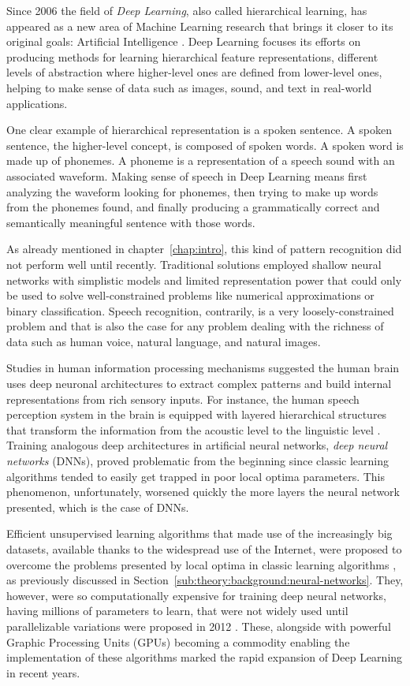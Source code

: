 Since 2006 the field of \emph{Deep Learning}, also called hierarchical learning, has appeared as a new area of Machine Learning research that brings it closer to its original goals: Artificial Intelligence \cite{Deng2014}.
Deep Learning focuses its efforts on producing methods for learning hierarchical feature representations, different levels of abstraction where higher-level ones are defined from lower-level ones, helping to make sense of data such as images, sound, and text in real-world applications.

One clear example of hierarchical representation is a spoken sentence.
A spoken sentence, the higher-level concept, is composed of spoken words.
A spoken word is made up of phonemes.
A phoneme is a representation of a speech sound with an associated waveform.
Making sense of speech in Deep Learning means first analyzing the waveform looking for phonemes, then trying to make up words from the phonemes found, and finally producing a grammatically correct and semantically meaningful sentence with those words.

As already mentioned in chapter~\ref{chap:intro}, this kind of pattern recognition did not perform well until recently.
Traditional solutions employed shallow neural networks with simplistic models and limited representation power that could only be used to solve well-constrained problems like numerical approximations or binary classification.
Speech recognition, contrarily, is a very loosely-constrained problem and that is also the case for any problem dealing with the richness of data such as human voice, natural language, and natural images.

Studies in human information processing mechanisms suggested the human brain uses deep neuronal architectures to extract complex patterns and build internal representations from rich sensory inputs.
For instance, the human speech perception system in the brain is equipped with layered hierarchical structures that transform the information from the acoustic level to the linguistic level \cite{Deng1999,Baker2009}.
Training analogous deep architectures in artificial neural networks, \emph{deep neural networks} (DNNs), proved problematic from the beginning since classic learning algorithms tended to easily get trapped in poor local optima parameters.
This phenomenon, unfortunately, worsened quickly the more layers the neural network presented, which is the case of DNNs.

Efficient unsupervised learning algorithms that made use of the increasingly big datasets, available thanks to the widespread use of the Internet, were proposed to overcome the problems presented by local optima in classic learning algorithms \cite{LeCun2004,Hinton2006}, as previously discussed in Section~\ref{sub:theory:background:neural-networks}.
They, however, were so computationally expensive for training deep neural networks, having millions of parameters to learn, that were not widely used until parallelizable variations were proposed in 2012 \cite{Dean2012,Chen2012}.
These, alongside with powerful Graphic Processing Units (GPUs) becoming a commodity enabling the implementation of these algorithms marked the rapid expansion of Deep Learning in recent years.

